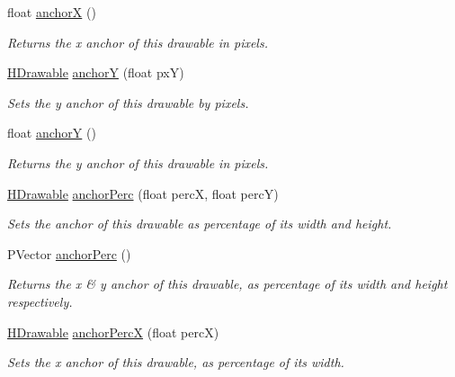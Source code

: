 \begin{DoxyCompactItemize}
float \hyperlink{classhype_1_1core_1_1drawable_1_1_h_drawable_a9bb0273629e7f72853ef8f304bc7f231}{anchor\-X} ()
\begin{DoxyCompactList}\small\item\em Returns the x anchor of this drawable in pixels. \end{DoxyCompactList}\item 
\hyperlink{classhype_1_1core_1_1drawable_1_1_h_drawable}{H\-Drawable} \hyperlink{classhype_1_1core_1_1drawable_1_1_h_drawable_a2e8e72269b9adbd51937bbc8a9dfb3ff}{anchor\-Y} (float px\-Y)
\begin{DoxyCompactList}\small\item\em Sets the y anchor of this drawable by pixels. \end{DoxyCompactList}\item 
float \hyperlink{classhype_1_1core_1_1drawable_1_1_h_drawable_a3fc39833727f9bd6f1c886619fe977f2}{anchor\-Y} ()
\begin{DoxyCompactList}\small\item\em Returns the y anchor of this drawable in pixels. \end{DoxyCompactList}\item 
\hyperlink{classhype_1_1core_1_1drawable_1_1_h_drawable}{H\-Drawable} \hyperlink{classhype_1_1core_1_1drawable_1_1_h_drawable_a1ffe245274ebfbfa9bc0684aa6014902}{anchor\-Perc} (float perc\-X, float perc\-Y)
\begin{DoxyCompactList}\small\item\em Sets the anchor of this drawable as percentage of its width and height. \end{DoxyCompactList}\item 
P\-Vector \hyperlink{classhype_1_1core_1_1drawable_1_1_h_drawable_a01269e9198e5ed6763e767edf96d32cb}{anchor\-Perc} ()
\begin{DoxyCompactList}\small\item\em Returns the x \& y anchor of this drawable, as percentage of its width and height respectively. \end{DoxyCompactList}\item 
\hyperlink{classhype_1_1core_1_1drawable_1_1_h_drawable}{H\-Drawable} \hyperlink{classhype_1_1core_1_1drawable_1_1_h_drawable_a87dcd0bb9b7f7360b685dc33ca3e38d4}{anchor\-Perc\-X} (float perc\-X)
\begin{DoxyCompactList}\small\item\em Sets the x anchor of this drawable, as percentage of its width. \end{DoxyCompactList}\item 

\end{DoxyCompactItemize}
